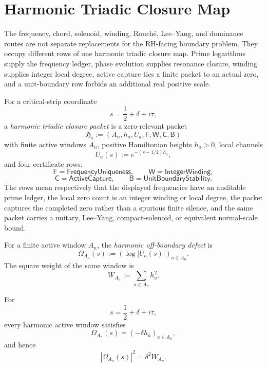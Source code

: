 \section{Harmonic Triadic Closure Map}
\label{sec:unified-reality-harmonic-triadic-closure-map}

The frequency, chord, solenoid, winding, Rouch\'e, Lee--Yang, and
dominance routes are not separate replacements for the RH-facing
boundary problem.  They occupy different rows of one harmonic triadic
closure map.  Prime logarithms supply the frequency ledger, phase
evolution supplies resonance closure, winding supplies integer local
degree, active capture ties a finite packet to an actual zero, and a
unit-boundary row forbids an additional real positive scale.

\begin{definition}
\label{def:unified-reality-harmonic-triadic-closure-packet}
For a critical-strip coordinate
$$
s=\frac12+\delta+i\tau,
$$
a \emph{harmonic triadic closure packet} is a zero-relevant packet
$$
\mathfrak H_s
:=
(A_n,h_a,U_a,\mathsf F,\mathsf W,\mathsf C,\mathsf B)
$$
with finite active windows $A_n$, positive Hamiltonian heights $h_a>0$,
local channels
$$
U_a(s):=e^{-(s-1/2)h_a},
$$
and four certificate rows:
$$
\mathsf F=\mathsf{FrequencyUniqueness},
\qquad
\mathsf W=\mathsf{IntegerWinding},
$$
$$
\mathsf C=\mathsf{ActiveCapture},
\qquad
\mathsf B=\mathsf{UnitBoundaryStability}.
$$
The rows mean respectively that the displayed frequencies have an
auditable prime ledger, the local zero count is an integer winding or
local degree, the packet captures the completed zero rather than a
spurious finite silence, and the same packet carries a unitary,
Lee--Yang, compact-solenoid, or equivalent normal-scale bound.
\end{definition}

\begin{definition}
\label{def:unified-reality-harmonic-off-boundary-defect}
For a finite active window $A_n$, the \emph{harmonic off-boundary defect}
is
$$
\Omega_{A_n}(s)
:=
\left(\log|U_a(s)|\right)_{a\in A_n}.
$$
The square weight of the same window is
$$
W_{A_n}:=\sum_{a\in A_n}h_a^2.
$$
\end{definition}

\begin{theorem}
\label{thm:unified-reality-harmonic-defect-reads-normal-coordinate}
For
$$
s=\frac12+\delta+i\tau,
$$
every harmonic active window satisfies
$$
\Omega_{A_n}(s)=(-\delta h_a)_{a\in A_n},
$$
and hence
$$
|\Omega_{A_n}(s)|^2=\delta^2W_{A_n}.
$$
\end{theorem}

